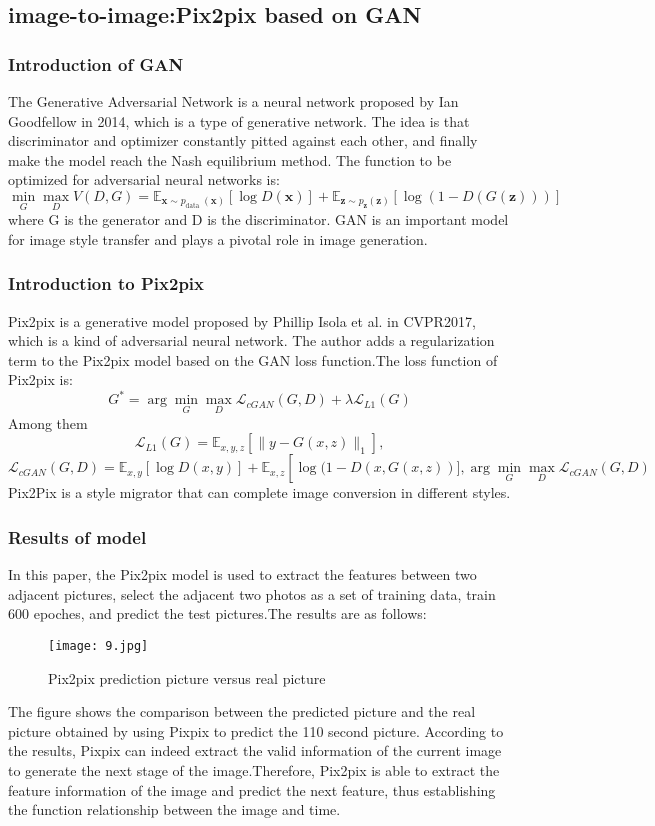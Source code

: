 \documentclass[12pt]{apmcmthesis}
\begin{document}
\subsection{image-to-image:Pix2pix based on GAN}
\subsubsection{Introduction of GAN}
The Generative Adversarial Network\cite{8} is a neural network proposed by Ian Goodfellow in 2014, which is a type of generative network. The idea is that discriminator and optimizer constantly  pitted against each other, and finally make the model reach the Nash equilibrium method. The function to be optimized for adversarial neural networks is:$$\min _{G} \max _{D} V(D, G)=\mathbb{E}_{\boldsymbol{x} \sim p_{\text {data }}(\boldsymbol{x})}[\log D(\boldsymbol{x})]+\mathbb{E}_{\boldsymbol{z} \sim p_{\boldsymbol{z}}(\boldsymbol{z})}[\log (1-D(G(\boldsymbol{z})))]$$where G is the generator and D is the discriminator. GAN is an important model for image style transfer and plays a pivotal role in image generation.

\subsubsection{Introduction to Pix2pix}
Pix2pix\cite{9} is a generative model proposed by Phillip Isola et al. in CVPR2017, which is a kind of adversarial neural network. The author adds a regularization term to the Pix2pix model based on the GAN loss function.The loss function of Pix2pix is:
$$G^{*}=\arg \min _{G} \max _{D} \mathcal{L}_{c G A N}(G, D)+\lambda \mathcal{L}_{L 1}(G)$$Among them$$\mathcal{L}_{L 1}(G)=\mathbb{E}_{x, y, z}\left[\|y-G(x, z)\|_{1}\right],$$
$$ \mathcal{L}_{c G A N}(G, D)=\mathbb{E}_{x, y}[\log D(x, y)]+\mathbb{E}_{x, z}\left[\log (1-D(x, G(x, z))], \arg \min _{G} \max _{D} \mathcal{L}_{c G A N}(G, D)\right. $$Pix2Pix is a style migrator that can complete image conversion in different styles.
\subsubsection{Results of model}
In this paper, the Pix2pix model is used to extract the features between two adjacent pictures, select the adjacent two photos as a set of training data, train 600 epoches, and predict the test pictures.The results are as follows:


\begin{figure}[htbp]
	\centering
	\texttt{[image: 9.jpg]}
	\caption{Pix2pix prediction picture versus real picture}
	\label{a}
\end{figure}
The figure shows the comparison between the predicted picture and the real picture obtained by using Pixpix to predict the 110 second picture. According to the results, Pixpix can indeed extract the valid information of the current image to generate the next stage of the image.Therefore, Pix2pix is able to extract the feature information of the image and predict the next feature, thus establishing the function relationship between the image and time.
\end{document}

